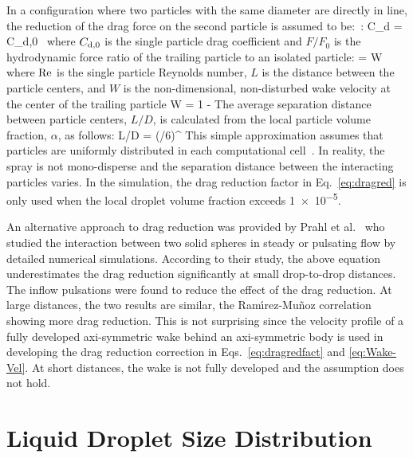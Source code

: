 In a configuration where two particles with the same diameter are directly in line, the reduction of the drag force on the second particle is assumed to be:~\cite{Ramirez:1}:
\be
  C_{\rm d} = C_{\rm d,0} \,  \label{eq:dragred}
\ee
where $C_{\rm d,0}$ is the single particle drag coefficient and $F / F_0$ is the hydrodynamic force ratio of the trailing particle to an isolated particle:
\be
   = W  \label{eq:dragredfact}
\ee
where $\hbox{Re}$ is the single particle Reynolds number, $L$ is the distance between the particle centers, and $W$ is the non-dimensional, non-disturbed wake velocity at the center of the trailing particle
\be
  W = 1 -   \label{eq:Wake-Vel}
\ee
The average separation distance between particle centers, $L/D$, is calculated from the local particle volume fraction, $\alpha$, as follows:
\be
  L/D = \left(\pi/6\alpha \right)^{}
\ee
This simple approximation assumes that particles are uniformly distributed in each computational cell~\cite{Bhattacharyya2008}. In reality, the spray is not mono-disperse and the separation distance between the interacting particles varies. In the simulation, the drag reduction factor in Eq.~\ref{eq:dragred} is only used when the local droplet volume fraction exceeds \num{1e-5}.

An alternative approach to drag reduction was provided by Prahl et al.~\cite{Prahl:1} who studied the interaction between two solid spheres in steady or pulsating flow by detailed numerical simulations. According to their study, the above equation underestimates the drag reduction significantly at small drop-to-drop distances. The inflow pulsations were found to reduce the effect of the drag reduction. At large distances, the two results are similar, the Ram\'{\i}rez-Mu\~{n}oz correlation showing more drag reduction. This is not surprising since the velocity profile of a fully developed axi-symmetric wake behind an axi-symmetric body is used in developing the drag reduction correction in Eqs.~\ref{eq:dragredfact} and \ref{eq:Wake-Vel}. At short distances, the wake is not fully developed and the assumption does not hold.

\section{Liquid Droplet Size Distribution}

